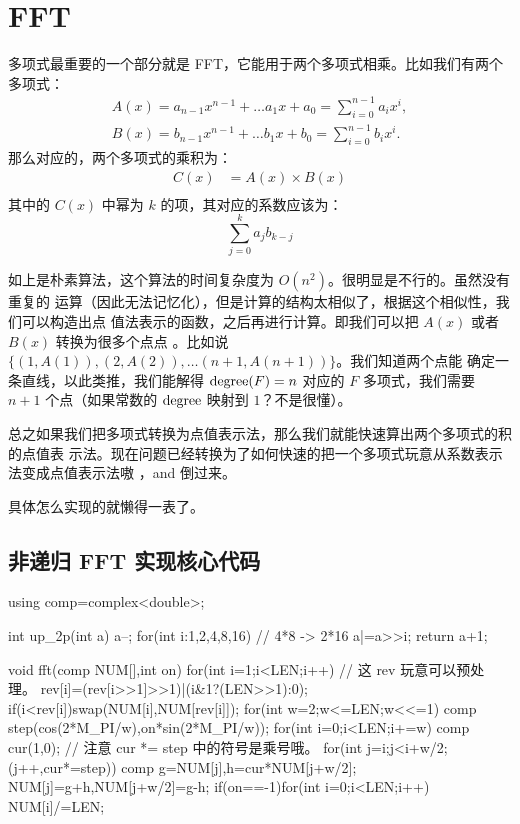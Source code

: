 \section{FFT}
多项式最重要的一个部分就是 FFT，它能用于两个多项式相乘。比如我们有两个多项式：
$$
\begin{array}{l}
    A(x) = a_{n-1} x^{n-1} + \ldots a_1 x + a_0 = \sum^{n-1}_{i=0} a_i x^i, \\
    B(x) = b_{n-1} x^{n-1} + \ldots b_1 x + b_0 = \sum^{n-1}_{i=0} b_i x^i.
\end{array}
$$
那么对应的，两个多项式的乘积为：
$$
\begin{aligned}
    C(x) & = A(x) \times B(x) \\
\end{aligned}
$$
其中的 $C(x)$ 中幂为 $k$ 的项，其对应的系数应该为：
$$
    \sum_{j=0}^{k} a_j b_{k-j}
$$

如上是朴素算法，这个算法的时间复杂度为 $O(n^2)$。很明显是不行的。虽然没有重复的
运算（因此无法记忆化），但是计算的结构太相似了，根据这个相似性，我们可以构造出点
值法表示的函数，之后再进行计算。即我们可以把 $A(x)$ 或者 $B(x)$ 转换为很多个点点
。比如说 $\{(1, A(1)), (2, A(2)), \ldots (n + 1, A(n + 1))\}$。我们知道两个点能
确定一条直线，以此类推，我们能解得 $\mathrm{degree}(F) = n$ 对应的 $F$ 多项式，我们需要
$n + 1$ 个点（如果常数的 $\mathrm{degree}$ 映射到 $1$？不是很懂）。

总之如果我们把多项式转换为点值表示法，那么我们就能快速算出两个多项式的积的点值表
示法。现在问题已经转换为了如何快速的把一个多项式玩意从系数表示法变成点值表示法嗷
，and 倒过来。

具体怎么实现的就懒得一表了。

\subsection{非递归 FFT 实现核心代码}
\begin{Cpp}
using comp=complex<double>;

int up_2p(int a){
  a--; for(int i:{1,2,4,8,16}) // 4*8 -> 2*16
    a|=a>>i;
  return a+1;
}

void fft(comp NUM[],int on){
  for(int i=1;i<LEN;i++){
    // 这 rev 玩意可以预处理。
    rev[i]=(rev[i>>1]>>1)|(i&1?(LEN>>1):0);
    if(i<rev[i])swap(NUM[i],NUM[rev[i]]);
  }
  for(int w=2;w<=LEN;w<<=1){
    comp step(cos(2*M_PI/w),on*sin(2*M_PI/w));
    for(int i=0;i<LEN;i+=w){
      comp cur(1,0);
      // 注意 cur *= step 中的符号是乘号哦。
      for(int j=i;j<i+w/2; (j++,cur*=step)){
        comp g=NUM[j],h=cur*NUM[j+w/2];
        NUM[j]=g+h,NUM[j+w/2]=g-h;
      }
    }
  }
  if(on==-1)for(int i=0;i<LEN;i++)
    NUM[i]/=LEN;
}
\end{Cpp}

